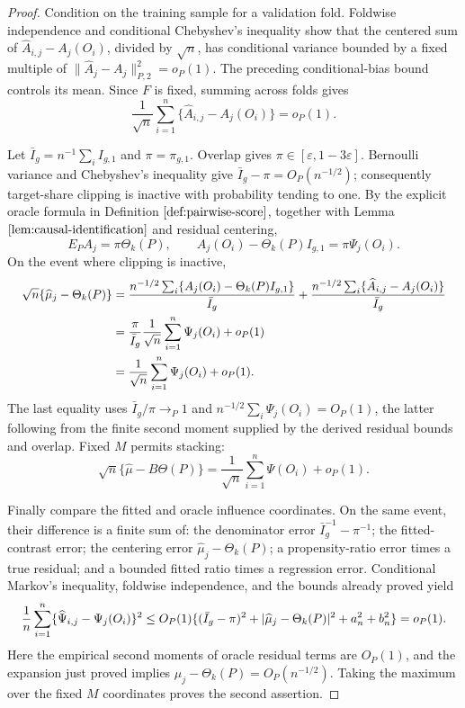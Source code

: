 \documentclass{article}
\begin{document}
\begin{proof}
Condition on the training sample for a validation fold. Foldwise independence and conditional Chebyshev's inequality show that the centered sum of \(\widehat A_{i,j}-A_j(O_i)\), divided by \(\sqrt n\), has conditional variance bounded by a fixed multiple of \(\|\widehat A_j-A_j\|_{P,2}^2=o_P(1)\). The preceding conditional-bias bound controls its mean. Since \(F\) is fixed, summing across folds gives
\[
 \frac1{\sqrt n}\sum_{i=1}^n\{\widehat A_{i,j}-A_j(O_i)\}=o_P(1).
\]

Let \(\bar I_g=n^{-1}\sum_i I_{g,1}\) and \(\pi=\pi_{g,1}\). Overlap gives \(\pi\in[\varepsilon,1-3\varepsilon]\). Bernoulli variance and Chebyshev's inequality give \(\bar I_g-\pi=O_P(n^{-1/2})\); consequently target-share clipping is inactive with probability tending to one. By the explicit oracle formula in Definition \(\ref{def:pairwise-score}\), together with Lemma \(\ref{lem:causal-identification}\) and residual centering,
\[
 E_PA_j=\pi\Theta_k(P),
 \qquad
 A_j(O_i)-\Theta_k(P)I_{g,1}=\pi\Psi_j(O_i).
\]
On the event where clipping is inactive,
\[
\makebox[\linewidth][c]{\resizebox{0.98\linewidth}{!}{\(\displaystyle \begin{aligned}
 \sqrt n\{\widehat\mu_j-\Theta_k(P)\}
 &=\frac{n^{-1/2}\sum_i\{A_j(O_i)-\Theta_k(P)I_{g,1}\}}{\bar I_g}
   +\frac{n^{-1/2}\sum_i\{\widehat A_{i,j}-A_j(O_i)\}}{\bar I_g}\\
 &=\frac{\pi}{\bar I_g}\frac1{\sqrt n}\sum_{i=1}^n\Psi_j(O_i)+o_P(1)\\
 &=\frac1{\sqrt n}\sum_{i=1}^n\Psi_j(O_i)+o_P(1).
\end{aligned}\)}}
\]
The last equality uses \(\bar I_g/\pi\to_P1\) and \(n^{-1/2}\sum_i\Psi_j(O_i)=O_P(1)\), the latter following from the finite second moment supplied by the derived residual bounds and overlap. Fixed \(M\) permits stacking:
\[
 \sqrt n\{\widehat\mu-B\Theta(P)\}
 =\frac1{\sqrt n}\sum_{i=1}^n\Psi(O_i)+o_P(1).
\]

Finally compare the fitted and oracle influence coordinates. On the same event, their difference is a finite sum of: the denominator error \(\bar I_g^{-1}-\pi^{-1}\); the fitted-contrast error; the centering error \(\widehat\mu_j-\Theta_k(P)\); a propensity-ratio error times a true residual; and a bounded fitted ratio times a regression error. Conditional Markov's inequality, foldwise independence, and the bounds already proved yield
\[
\makebox[\linewidth][c]{\resizebox{0.98\linewidth}{!}{\(\displaystyle \frac1n\sum_{i=1}^n\{\widehat\Psi_{i,j}-\Psi_j(O_i)\}^2
 \le O_P(1)\{(\bar I_g-\pi)^2
 +|\widehat\mu_j-\Theta_k(P)|^2+a_n^2+b_n^2\}=o_P(1).\)}}
\]
Here the empirical second moments of oracle residual terms are \(O_P(1)\), and the expansion just proved implies \(\widehat\mu_j-\Theta_k(P)=O_P(n^{-1/2})\). Taking the maximum over the fixed \(M\) coordinates proves the second assertion.
\end{proof}
\end{document}
